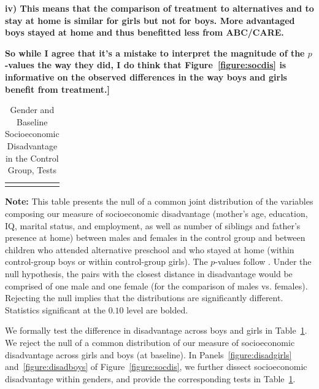  \textbf{iv) This means that the comparison of treatment to alternatives and to stay at home is similar for girls but not for boys. More advantaged boys stayed at home and thus benefitted less from ABC/CARE.}

 \textbf{So while I agree that it's a mistake to interpret the magnitude of the $p$-values the way they did, I do think that Figure~\ref{figure:socdis} is informative on the observed differences in the way boys and girls benefit from treatment.] } 


\begin{table}[!htpb]
\begin{threeparttable}
\caption{Gender and Baseline Socioeconomic Disadvantage in the Control Group, Tests} \label{table:disadtests}
\centering
\begin{tabularx}{16.5cm}{XcX}
&  &
\end{tabularx}
\begin{tablenotes}
\footnotesize
\item \textbf{Note:} This table presents the null of a common joint distribution of the variables composing our measure of socioeconomic disadvantage (mother's age, education, IQ, marital status, and employment, as well as number of siblings and father's presence at home) between males and females in the control group and between children who attended  alternative preschool and who stayed at home (within control-group boys or within control-group girls). The $p$-values follow \citet{Rosenbaum_2005_Distribution_JRSS}. Under the null hypothesis, the pairs with the closest distance in disadvantage would be comprised of one male and one female (for the comparison of males vs. females). Rejecting the null implies that the distributions are significantly different. Statistics significant at the $0.10$ level are bolded.
\end{tablenotes}
\end{threeparttable}
\end{table}

We formally test the difference in disadvantage across boys and girls in Table~\ref{table:disadtests}. We reject the null of a common distribution of our measure of socioeconomic disadvantage across girls and boys (at baseline). In Panels~\ref{figure:disadgirls} and~\ref{figure:disadboys} of Figure~\ref{figure:socdis}, we further dissect socioeconomic disadvantage within genders, and provide the corresponding tests in Table~\ref{table:disadtests}.


